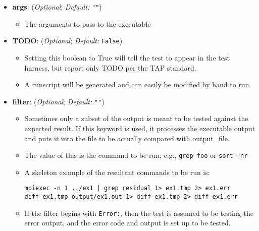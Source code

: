 \begin{itemize}
\begin{itemize}
      \end{itemize}


    \item[]  \textbf{args}: (\emph{Optional}; \emph{Default:} \lstinline{""})

      \begin{itemize}

      \item The arguments to pass to the executable

      \end{itemize}

    \item[]  \textbf{TODO}: (\emph{Optional}; \emph{Default:} \lstinline{False})
      \begin{itemize}

      \item Setting this boolean to True will tell the test to appear in the test harness, but
      report only TODO per the TAP standard.

      \item A runscript will be generated and can easily be modified by hand to run

      \end{itemize}

    \item[]  \textbf{filter}: (\emph{Optional}; \emph{Default:} \lstinline{""})

      \begin{itemize}

      \item Sometimes only a subset of the output is meant to be tested
      against the expected result.  If this keyword is used, it
      processes the executable output and puts it into the file
      to be actually compared with output\_file.

      \item The value of this is the command to be run; e.g., \lstinline{grep foo} or
      \lstinline{sort -nr}

      \item A skeleton example of the resultant commands to be run is:
      \begin{lstlisting}
mpiexec -n 1 ../ex1 | grep residual 1> ex1.tmp 2> ex1.err
diff ex1.tmp output/ex1.out 1> diff-ex1.tmp 2> diff-ex1.err
      \end{lstlisting}

      \item If the filter begins with \lstinline{Error:}, then the test is
            assumed to be testing the error output, and the error code and
            output is set up to be tested.


\end{itemize}
\end{itemize}
